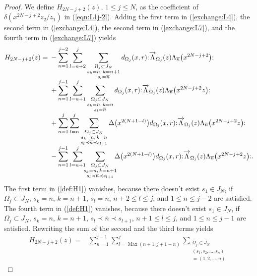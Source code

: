\documentclass[pdftex]{sigma}
\numberwithin{equation}{section}
\begin{document}
\begin{proof}
We define $H_{2N-j+2}(z)$, $1\leq j \leq N$, as the coefficient of
$\delta(x^{2N-j+2}z_2/z_1)$ in (\ref{eqn:L1j-2}). Adding the first term in (\ref{exchange:L4}),
the second term in (\ref{exchange:L4}), the second term in (\ref{exchange:L7}),
and the fourth term in (\ref{exchange:L7}) yields
\begin{align}
H_{2N-j+2}(z)={}&-\sum_{n=1}^{j-2}\sum_{l=n+2}^{j}
\sum_{\substack{\Omega_j \subset J_N\\s_k=n,\, k=n+1\\s_l=\overline{n}}}
d_{\Omega_j}(x,r){:}\overrightarrow{\Lambda}_{\Omega_j}(z)
\Lambda_{\overline{n}}\big(x^{2N-j+2}\big){:}\notag
\\[-1ex]
&+\sum_{n=1}^{j-1}\sum_{l=n+1}^{j}\sum_{\substack{\Omega_j \subset J_N\\
s_k=n,\, k=n\\s_l=\overline{n}}}d_{\Omega_j}(x,r)
{:}\overrightarrow{\Lambda}_{\Omega_j}(z)
\Lambda_{\overline{n}}\big(x^{2N-j+2}z\big){:}\notag
\\[-1ex]
&+\sum_{n=1}^{j}\sum_{l=n}^{j}\sum_{\substack{\Omega_j \subset J_N
\\s_k=n,\, k=n\\ s_l \prec \overline{n} \prec s_{l+1}}}
\Delta\big(x^{2(N+1-l)}\big) d_{\Omega_j}(x,r)
{:}\overrightarrow{\Lambda}_{\Omega_j}(z)
\Lambda_{\overline{n}}\big(x^{2N-j+2}z\big){:}\notag
\\[-1ex]
&-\sum_{n=1}^{j-1}\sum_{l=n+1}^{j}\!\!\!\sum_{\substack{\Omega_j \subset J_N
\\s_k=n,\, k=n+1\\s_l\prec \overline{n} \prec s_{l+1}}}
\!\!\!\Delta\big(x^{2(N+1-l)}\big) d_{\Omega_j}(x,r)
{:}\overrightarrow{\Lambda}_{\Omega_j}(z)
\Lambda_{\overline{n}}\big(x^{2N-j+2}z\big){:}.
\label{def:H1}
\end{align}
The first term in (\ref{def:H1}) vanishes,
because there doesn't exist $s_1 \in J_N$,
if $\Omega_j \subset J_N$, $s_k=n$, $k=n+1$, $s_l=\overline{n}$, $n+2\leq l \leq j$,
and $1\leq n \leq j-2$ are satisfied. The fourth term in (\ref{def:H1}) vanishes,
because there doesn't exist $s_1 \in J_N$,
if $\Omega_j \subset J_N$, $s_k=n$, $k=n+1$,
$s_l \prec \overline{n} \prec s_{l+1}$, $n+1\leq l \leq j$, and $1\leq n \leq j-1$ are satisfied.
Rewriting the sum of the second and the third terms yields
\begin{align*}
{H}_{2N-j+2}(z)={}&\sum_{n=1}^{j-1}\sum_{l=\operatorname{Max}(n+1,j+1-n)}^{j}
\sum_{\substack{\Omega_j \subset J_N\\(s_1, s_2, \dots, s_n)\\=(1, 2, \dots, n)
}}
\end{align*}
\end{proof}
\end{document}
